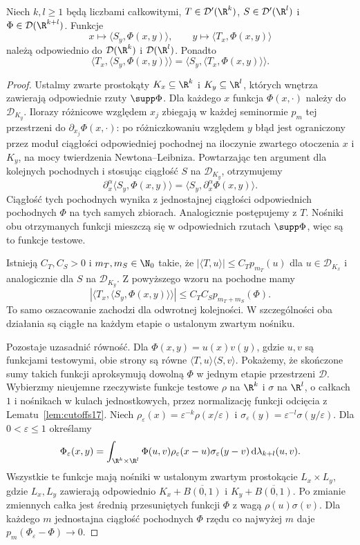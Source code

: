 \begin{lemat}
\label{lem:iterated-distributions21}
Niech $k,l\ge1$ będą liczbami całkowitymi,
$T\in\mathcal D'(\R^k)$,
$S\in\mathcal D'(\R^l)$ i
$\Phi\in\mathcal D(\R^{k+l})$. Funkcje
\[
 x\longmapsto\langle S_y,\Phi(x,y)\rangle,
 \qquad
 y\longmapsto\langle T_x,\Phi(x,y)\rangle
\]
należą odpowiednio do $\mathcal D(\R^k)$ i
$\mathcal D(\R^l)$. Ponadto
\[
 \langle T_x,\langle S_y,\Phi(x,y)\rangle\rangle
 =\langle S_y,\langle T_x,\Phi(x,y)\rangle\rangle.
\]
\end{lemat}
\begin{proof}
Ustalmy zwarte prostokąty $K_x\subseteq\R^k$ i
$K_y\subseteq\R^l$, których wnętrza zawierają odpowiednie
rzuty $\supp\Phi$. Dla każdego $x$ funkcja $\Phi(x,\cdot)$
należy do $\mathcal D_{K_y}$. Ilorazy różnicowe względem
$x_j$ zbiegają w każdej seminormie $p_m$ tej przestrzeni
do $\partial_{x_j}\Phi(x,\cdot)$: po różniczkowaniu
względem $y$ błąd jest ograniczony przez moduł ciągłości
odpowiedniej pochodnej na iloczynie zwartego otoczenia $x$
i $K_y$, na mocy twierdzenia Newtona--Leibniza.
Powtarzając ten argument dla kolejnych pochodnych i
stosując ciągłość $S$ na $\mathcal D_{K_y}$, otrzymujemy
\[
 \partial_x^\alpha\langle S_y,\Phi(x,y)\rangle
 =\langle S_y,\partial_x^\alpha\Phi(x,y)\rangle.
\]
Ciągłość tych pochodnych wynika z jednostajnej ciągłości
odpowiednich pochodnych $\Phi$ na tych samych zbiorach.
Analogicznie postępujemy z $T$. Nośniki obu otrzymanych
funkcji mieszczą się w odpowiednich rzutach $\supp\Phi$,
więc są to funkcje testowe.

Istnieją $C_T,C_S>0$ i $m_T,m_S\in\N_0$ takie, że
$|\langle T,u\rangle|\le C_Tp_{m_T}(u)$ dla
$u\in\mathcal D_{K_x}$ i analogicznie dla $S$ na
$\mathcal D_{K_y}$. Z powyższego wzoru na pochodne mamy
\[
 |\langle T_x,\langle S_y,\Phi(x,y)\rangle\rangle|
 \le C_TC_S p_{m_T+m_S}(\Phi).
\]
To samo oszacowanie zachodzi dla odwrotnej kolejności.
W szczególności oba działania są ciągłe na każdym etapie
o ustalonym zwartym nośniku.

Pozostaje uzasadnić równość. Dla $\Phi(x,y)=u(x)v(y)$,
gdzie $u,v$ są funkcjami testowymi, obie strony są równe
$\langle T,u\rangle\langle S,v\rangle$.
Pokażemy, że skończone sumy takich funkcji aproksymują
dowolną $\Phi$ w jednym etapie przestrzeni $\mathcal D$.
Wybierzmy nieujemne rzeczywiste funkcje testowe
$\rho$ na $\R^k$ i $\sigma$ na $\R^l$, o całkach $1$
i nośnikach w kulach jednostkowych, przez normalizację
funkcji odcięcia z Lematu~\ref{lem:cutoffs17}.
Niech $\rho_\varepsilon(x)=\varepsilon^{-k}\rho(x/\varepsilon)$
i $\sigma_\varepsilon(y)=\varepsilon^{-l}\sigma(y/\varepsilon)$.
Dla $0<\varepsilon\le1$ określamy
\[
 \Phi_\varepsilon(x,y)=
 \int_{\R^k\times\R^l}\Phi(u,v)
 \rho_\varepsilon(x-u)\sigma_\varepsilon(y-v)
 \,\mathrm d\lambda_{k+l}(u,v).
\]
Wszystkie te funkcje mają nośniki w ustalonym zwartym
prostokącie $L_x\times L_y$, gdzie $L_x,L_y$ zawierają
odpowiednio $K_x+\overline{B(0,1)}$ i
$K_y+\overline{B(0,1)}$. Po zmianie zmiennych całka
jest średnią przesuniętych funkcji $\Phi$ z wagą
$\rho(u)\sigma(v)$. Dla każdego $m$ jednostajna ciągłość
pochodnych $\Phi$ rzędu co najwyżej $m$ daje
$p_m(\Phi_\varepsilon-\Phi)\to0$.


\end{proof}
